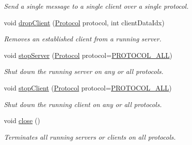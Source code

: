 \begin{DoxyCompactItemize}
\begin{DoxyCompactList}\small\item\em Send a single message to a single client over a single protocol. \end{DoxyCompactList}\item 
void \hyperlink{classNetManager_a9e6957843f9cf05afbc38e23b9d46f52}{drop\-Client} (\hyperlink{NetManager_8h_ac5a1bd9a1ae33c413bb774e1ac32501c}{Protocol} protocol, int client\-Data\-Idx)
\begin{DoxyCompactList}\small\item\em Removes an established client from a running server. \end{DoxyCompactList}\item 
void \hyperlink{classNetManager_ac4d5cdb235713bea820ab5275a0da920}{stop\-Server} (\hyperlink{NetManager_8h_ac5a1bd9a1ae33c413bb774e1ac32501c}{Protocol} protocol=\hyperlink{NetManager_8h_a06fc87d81c62e9abb8790b6e5713c55ba78c8c360e9d58fb53829c58ac0ae6a43}{P\-R\-O\-T\-O\-C\-O\-L\-\_\-\-A\-L\-L})
\begin{DoxyCompactList}\small\item\em Shut down the running server on any or all protocols. \end{DoxyCompactList}\item 
void \hyperlink{classNetManager_a55eb599a64a651d890641a256ab4db9a}{stop\-Client} (\hyperlink{NetManager_8h_ac5a1bd9a1ae33c413bb774e1ac32501c}{Protocol} protocol=\hyperlink{NetManager_8h_a06fc87d81c62e9abb8790b6e5713c55ba78c8c360e9d58fb53829c58ac0ae6a43}{P\-R\-O\-T\-O\-C\-O\-L\-\_\-\-A\-L\-L})
\begin{DoxyCompactList}\small\item\em Shut down the running client on any or all protocols. \end{DoxyCompactList}\item 
void \hyperlink{classNetManager_afcf943b4ab1e94ba479f4e3f0cd9da2e}{close} ()
\begin{DoxyCompactList}\small\item\em Terminates all running servers or clients on all protocols. \end{DoxyCompactList}\end{DoxyCompactItemize}

